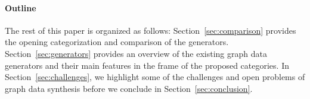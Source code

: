 

\paragraph*{Outline} The rest of this paper is organized as follows: Section~\ref{sec:comparison}  provides the opening categorization and comparison of the generators. Section~\ref{sec:generators} provides an overview of the existing graph data generators and their main features in the frame of the proposed categories. %
In Section~\ref{sec:challenges}, we highlight some of the challenges and open problems of graph data synthesis before we conclude in Section~\ref{sec:conclusion}.


